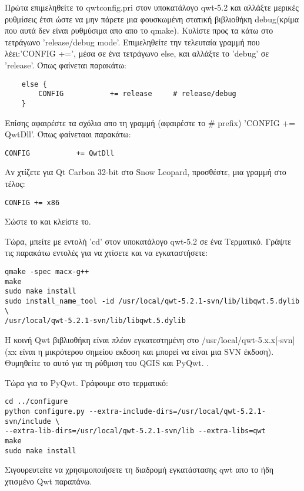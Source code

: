 Πρώτα επιμεληθείτε το qwtconfig.pri στον υποκατάλογο qwt-5.2 και αλλάξτε μερικές ρυθμίσεις έτσι ώστε να μην πάρετε μια φουσκωμένη στατική βιβλιοθήκη debug(κρίμα που αυτά δεν είναι ρυθμύσιμα απο απο το qmake). Κυλίστε προς τα κάτω στο τετράγωνο ’release/debug mode’. Επιμεληθείτε την τελευταία γραμμή που λέει:’CONFIG +=’, μέσα σε ένα τετράγωνο else, και αλλάξτε το 'debug' σε 'release'.  Όπως φαίνεται παρακάτω:

\begin{verbatim}
    else {
        CONFIG           += release     # release/debug
    }
\end{verbatim}

Επίσης αφαιρέστε τα σχόλια απο τη γραμμή (αφαιρέστε το \# prefix) 'CONFIG += QwtDll'. Όπως φαίνετααι παρακάτω:

\begin{verbatim}
CONFIG           += QwtDll
\end{verbatim}

Αν χτίζετε για Qt Carbon 32-bit στο Snow Leopard, προσθέστε, μια γραμμή στο τέλος:

\begin{verbatim}
CONFIG += x86
\end{verbatim}

Σώστε το και κλείστε το.

Τώρα, μπείτε με εντολή 'cd' στον υποκατάλογο qwt-5.2 σε ένα Τερματικό. Γράψτε τις παρακάτω εντολές για να χτίσετε και να εγκαταστήσετε:

\begin{verbatim}
qmake -spec macx-g++
make
sudo make install
sudo install_name_tool -id /usr/local/qwt-5.2.1-svn/lib/libqwt.5.dylib \
/usr/local/qwt-5.2.1-svn/lib/libqwt.5.dylib
\end{verbatim}

Η κοινή Qwt βιβλιοθήκη είναι πλέον εγκατεστημένη στο /usr/local/qwt-5.x.x[-svn] (xx είναι η μικρότερου σημείου εκδοση και μπορεί να είναι μια SVN έκδοση). Θυμηθείτε το αυτό για τη ρύθμιση του QGIS και PyQwt. .

Τώρα για το PyQwt. Γράφουμε στο τερματικό:

\begin{verbatim}
cd ../configure
python configure.py --extra-include-dirs=/usr/local/qwt-5.2.1-svn/include \
--extra-lib-dirs=/usr/local/qwt-5.2.1-svn/lib --extra-libs=qwt
make
sudo make install
\end{verbatim}

Σιγουρευτείτε να χρησιμοποιήσετε τη διαδρομή εγκατάστασης qwt απο το ήδη χτισμένο Qwt παραπάνω.

